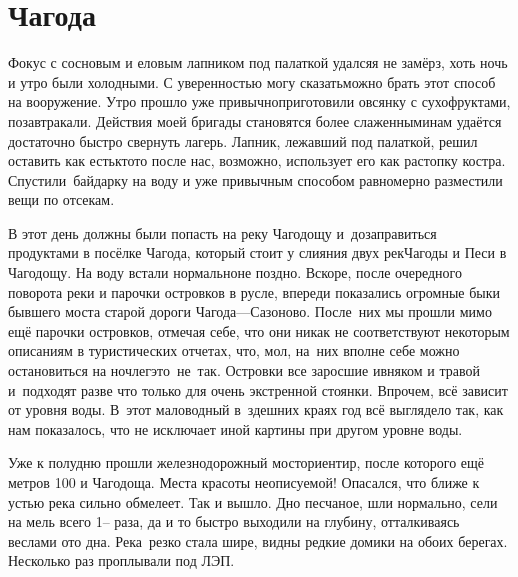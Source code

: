 \chapter{Чагода}

Фокус с сосновым и еловым лапником под палаткой удался\mdash я не замёрз, хоть ночь и утро были холодными. С уверенностью могу сказать\mdash можно брать этот способ на вооружение. Утро прошло уже привычно\mdash приготовили овсянку с сухофруктами, позавтракали. Действия моей бригады становятся более слаженными\mdash нам удаётся достаточно быстро свернуть лагерь. Лапник, лежавший под палаткой, решил оставить как есть\mdash кто\sdash то после нас, возможно, использует его как растопку костра. Спустили~байдарку на воду и уже привычным  способом равномерно разместили вещи по отсекам. 

В этот день должны были попасть на реку Чагодощу и~дозаправиться продуктами в посёлке Чагода, который стоит у слияния двух рек\mdash Чагоды и Песи в Чагодощу. На воду встали нормально\mdash не поздно. Вскоре, после очередного поворота реки и парочки островков в русле, впереди показались огромные быки бывшего моста старой дороги Чагода\thinspace\nobreakdash---\thinspace Сазоново. После~них мы прошли мимо ещё парочки островков, отмечая себе, что они никак не соответствуют некоторым описаниям в туристических отчетах, что, мол, на~них вполне себе можно остановиться на ночлег\mdash это~не~так. Островки все заросшие ивняком и травой и~подходят разве что только для очень экстренной стоянки. Впрочем, всё зависит от уровня воды. В~этот маловодный в~здешних краях год всё выглядело так, как нам показалось, что не исключает иной картины при другом уровне воды. 

Уже к полудню прошли железнодорожный мост\mdash ориентир, после которого ещё метров 100 и Чагодоща. Места красоты неописуемой! Опасался, что ближе к устью река сильно обмелеет. Так и вышло. Дно песчаное, шли нормально, сели на мель всего 1\thinspace\nobreakdash-- раза, да и то быстро выходили на глубину, отталкиваясь веслами ото дна. Река~резко стала шире, видны редкие домики на обоих берегах. Несколько раз проплывали под ЛЭП. 

